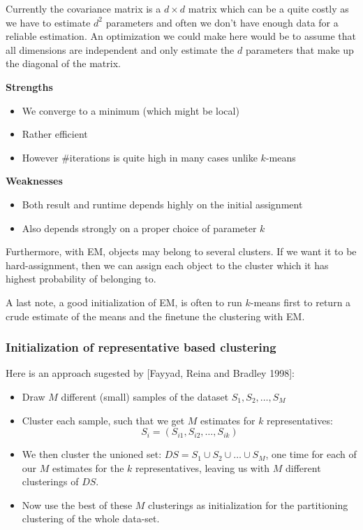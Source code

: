     Currently the covariance matrix is a $d \times d$ matrix which can be a 
    quite costly as we have to estimate $d^2$ parameters and often we don't 
    have enough data for a reliable estimation. An optimization we could make 
    here would be to assume that all dimensions are independent and only 
    estimate the $d$ parameters that make up the diagonal of the matrix.
    
    \textbf{Strengths}
    \begin{itemize}
        \item We converge to a minimum (which might be local)
        \item Rather efficient 
        \item However \#iterations is quite high in many cases unlike $k$-means
    \end{itemize}
    \textbf{Weaknesses}
    \begin{itemize}
        \item Both result and runtime depends highly on the initial assignment
        \item Also depends strongly on a proper choice of parameter $k$
    \end{itemize}
    Furthermore, with EM, objects may belong to several clusters. If we want it 
    to be hard-assignment, then we can assign each object to the cluster which 
    it has highest probability of belonging to.
    
    A last note, a good initialization of EM, is often to run $k$-means first 
    to return a crude estimate of the means and the finetune the clustering 
    with EM.
    
    \subsubsection{Initialization of representative based clustering}
    Here is an approach sugested by [Fayyad, Reina and Bradley 1998]:
    \begin{itemize}
        \item Draw $M$ different (small) samples of the dataset 
        $S_1,S_2,\dots,S_M$
        \item Cluster each sample, such that we get $M$ estimates for $k$ 
        representatives:
        \begin{equation*}
            S_i=(S_{i1}, S_{i2},\dots, S_{ik})
        \end{equation*}
        \item We then cluster the unioned set: $DS=S_1 \cup S_2 \cup \dots \cup 
        S_M$, one time for each of our $M$ estimates for the $k$ 
        representatives, leaving us with $M$ different clusterings of $DS$.
        \item Now use the best of these $M$ clusterings as initialization for 
        the partitioning clustering of the whole data-set.
    \end{itemize}
    
